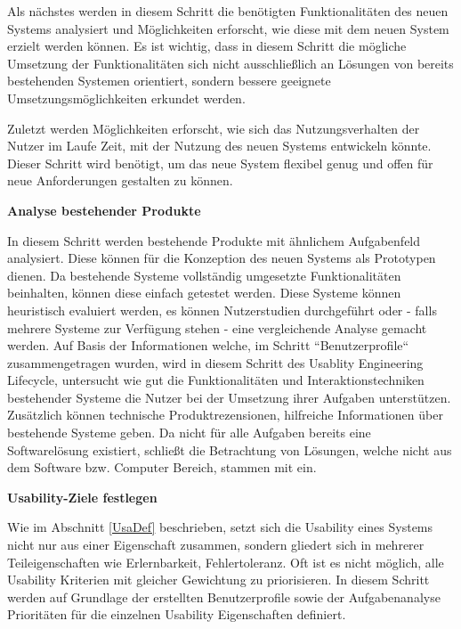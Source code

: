 Als nächstes werden in diesem Schritt die benötigten Funktionalitäten des neuen Systems analysiert und Möglichkeiten erforscht, wie diese mit dem neuen System erzielt werden können. 
Es ist wichtig, dass in diesem Schritt die mögliche Umsetzung der Funktionalitäten sich nicht ausschließlich an Lösungen von bereits bestehenden Systemen orientiert, sondern 
bessere geeignete Umsetzungsmöglichkeiten erkundet werden. \cite[S.~77]{Nielsen1994}

Zuletzt werden Möglichkeiten erforscht, wie sich das Nutzungsverhalten der Nutzer im Laufe Zeit, mit der Nutzung des neuen Systems entwickeln könnte. Dieser Schritt wird  
benötigt, um das neue System flexibel genug und offen für neue Anforderungen gestalten zu können. \cite[S.~78]{Nielsen1994}

\vspace{5mm} 
\textbf{Analyse bestehender Produkte} 
 
In diesem Schritt werden bestehende Produkte mit ähnlichem Aufgabenfeld analysiert. Diese können für die Konzeption des neuen Systems als Prototypen dienen. 
Da bestehende Systeme vollständig umgesetzte Funktionalitäten beinhalten, können diese einfach getestet werden.    
Diese Systeme können heuristisch evaluiert werden, es können Nutzerstudien durchgeführt oder - falls mehrere Systeme zur Verfügung stehen - eine vergleichende Analyse gemacht werden. Auf Basis der Informationen welche, im Schritt ``Benutzerprofile`` zusammengetragen wurden, wird in diesem Schritt des Usablity Engineering Lifecycle, untersucht wie gut die Funktionalitäten und Interaktionstechniken 
bestehender Systeme die Nutzer bei der Umsetzung ihrer Aufgaben unterstützen. Zusätzlich können technische Produktrezensionen, hilfreiche Informationen über bestehende Systeme geben. 
Da nicht für alle Aufgaben bereits eine Softwarelösung existiert, schließt \citeauthor{Nielsen1994} die Betrachtung von Lösungen, welche nicht aus dem Software bzw. Computer Bereich, stammen mit ein. \cite[S.~78]{Nielsen1994} 

\vspace{5mm} 
\textbf{Usability-Ziele festlegen} 

Wie im Abschnitt \ref{UsaDef} beschrieben, setzt sich die Usability eines Systems nicht nur aus einer Eigenschaft zusammen, sondern gliedert sich in mehrerer Teileigenschaften wie Erlernbarkeit, Fehlertoleranz. Oft ist es nicht möglich, alle Usability Kriterien mit gleicher Gewichtung zu priorisieren. In diesem Schritt werden auf Grundlage der erstellten Benutzerprofile sowie der Aufgabenanalyse Prioritäten für die einzelnen Usability Eigenschaften definiert. \cite[S.~79]{Nielsen1994}

